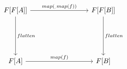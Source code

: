 \documentclass{article}
\begin{document}
\[
\begin{tikzcd}[column sep=3cm, row sep=2cm]
  F[F[A]] \arrow[r, "map(_.map(f))"] \arrow[d, "flatten"] & F[F[B]] \arrow[d, "flatten"] \\
  F[A] \arrow[r, "map(f)"] & F[B]
\end{tikzcd}
\]
\end{document}
